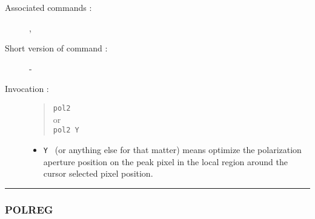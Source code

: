 \begin{description}
\item[Associated commands :] {\tt {}},
{\tt {}}
\item[Short version of command :] -
\item[Invocation :]

\begin{quote}{\tt  pol2 }\\
or \\
{\tt pol2 Y }
\end{quote}

\begin{itemize}

\item {\tt Y } (or anything else for that matter) means optimize the
 polarization aperture position on the peak pixel in the
 local region around the cursor selected pixel position.
\end{itemize}

\end{description}

\hrule
\subsubsection*{\label{POLREG}POLREG}

